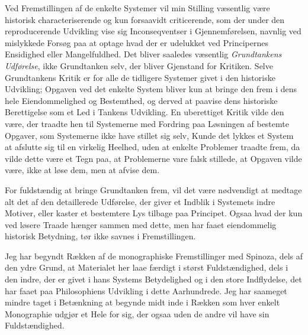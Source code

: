 \documentclass[12pt,a4paper]{book}
\newcommand{\opage}[1]{\marginnote{\footnotesize\textit{[#1]}}}
\begin{document}
Ved Fremstillingen af de enkelte Systemer vil min Stilling væsentlig
være historisk characteriserende og kun forsaavidt criticerende, som
der under den reproducerende Udvikling vise sig Inconseqventser i
Gjennemførelsen, navnlig ved mislykkede Forsøg paa at optage hvad der
er udelukket ved Principernes Ensidighed eller Mangelfuldhed. Det
bliver saaledes væsentlig \emph{Grundtankens Udførelse}, ikke
Grundtanken selv, der bliver Gjenstand for Kritiken. Selve
Grundtankens Kritik er for alle de tidligere Systemer givet i den
historiske Udvikling; Opgaven ved det enkelte System bliver kun at
bringe den frem i dens hele Eiendommelighed og Bestemthed, og derved
at paavise dens historiske Berettigelse som et Led i Tankens
Udvikling. En uberettiget Kritik vilde den være, der traadte hen til
Systemerne med Fordring paa Løsningen af bestemte Opgaver, som
Systemerne ikke have stillet sig selv, Kunde det lykkes et System at
afslutte sig til en virkelig Heelhed, uden at enkelte Problemer
traadte frem, da vilde dette være et Tegn paa, at Problemerne vare
falsk stillede, at Opgaven vilde være, ikke at løse dem, men at afvise
dem.

For fuldstændig at bringe Grundtanken frem, vil det være nødvendigt at
medtage alt det af den detaillerede Udførelse, der giver et Indblik i
Systemets indre Motiver, eller kaster et bestemtere Lys tilbage paa
Principet. Ogsaa hvad
\opage{13} \setcounter{footnote}{0}%
der kun ved løsere Traade hænger sammen med dette, men har faaet
eiendommelig historisk Betydning, tør ikke savnes i Fremstillingen.

Jeg har begyndt Rækken af de monographiske Fremstillinger med Spinoza,
dels af den ydre Grund, at Materialet her laae færdigt i størst
Fuldstændighed, dels i den indre, der er givet i hans Systems
Betydelighed og i den store Indflydelse, det har faaet paa
Philosophiens Udvikling i dette Aarhundrede. Jeg har saameget mindre
taget i Betænkning at begynde midt inde i Rækken som hver enkelt
Monographie udgjør et Hele for sig, der ogsaa uden de andre vil have
sin Fuldstændighed.
\end{document}
